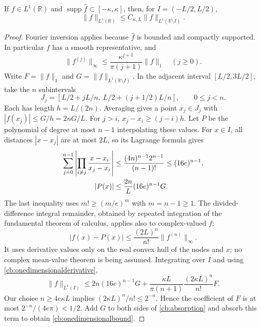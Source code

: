 \begin{lemma}
\label{cb:onedimensional}
If $f\in L^1(\mathbb R)$ and
$\operatorname{supp}\widehat f\subset[-\kappa,\kappa]$, then, for
$I=(-L/2,L/2)$,
\begin{equation}
 \|f\|_{L^1(\mathbb R)}
 \leq C_{\kappa,L}\|f\|_{L^1(\mathbb R\setminus I)}.
 \label{cb:onedimensionalbound}
\end{equation}
\end{lemma}
\begin{proof}
Fourier inversion applies because $\widehat f$ is bounded and compactly
supported. In particular $f$ has a smooth representative, and
\begin{equation}
 \|f^{(j)}\|_\infty
 \leq\frac{\kappa^{j+1}}{\pi(j+1)}\|f\|_1
 \quad(j\geq0).
 \label{cb:onedimensionalderivative}
\end{equation}
Write $F=\|f\|_1$ and $G=\|f\|_{L^1(\mathbb R\setminus I)}$.
In the adjacent interval $[L/2,3L/2]$, take the $n$ subintervals
\begin{equation}
 J_j=\left[L/2+jL/n,\ L/2+(j+1/2)L/n\right],
 \qquad 0\leq j<n.
 \label{cb:nodeslots}
\end{equation}
Each has length $h=L/(2n)$. Averaging gives a point $x_j\in J_j$ with
$|f(x_j)|\leq G/h=2nG/L$. For $j>i$,
$x_j-x_i\geq(j-i)h$. Let $P$ be the polynomial of degree at most
$n-1$ interpolating these values. For $x\in I$, all distances
$|x-x_j|$ are at most $2L$, so its Lagrange formula gives
\begin{align}
 \sum_{j=0}^{n-1}
  \left|\prod_{i\ne j}\frac{x-x_i}{x_j-x_i}\right|
 &\leq\frac{(4n)^{n-1}2^{n-1}}{(n-1)!}
 \leq(16e)^{n-1},\notag\\
 |P(x)|&\leq\frac{2n}{L}(16e)^{n-1}G.
 \label{cb:lagrangebound}
\end{align}
The last inequality uses $m!\geq(m/e)^m$ with $m=n-1\geq1$.
The divided-difference integral remainder, obtained by repeated integration
of the fundamental theorem of calculus, applies also to complex-valued $f$:
\begin{equation}
 |f(x)-P(x)|\leq\frac{(2L)^n}{n!}\|f^{(n)}\|_\infty.
 \label{cb:interpolationremainder}
\end{equation}
It uses derivative values only on the real convex hull of the nodes and $x$;
no complex mean-value theorem is being assumed.
Integrating over $I$ and using \eqref{cb:onedimensionalderivative},
\begin{equation}
 \|f\|_{L^1(I)}
 \leq2n(16e)^{n-1}G+
    \frac{\kappa L}{\pi(n+1)}\frac{(2\kappa L)^n}{n!}F.
 \label{cb:absorption}
\end{equation}
Our choice $n\geq4e\kappa L$ implies
$(2\kappa L)^n/n!\leq2^{-n}$. Hence the coefficient of $F$ is
at most $2^{-n}/(4e\pi)<1/2$. Add $G$ to both sides of
\eqref{cb:absorption} and absorb this term to obtain
\eqref{cb:onedimensionalbound}.
\end{proof}

